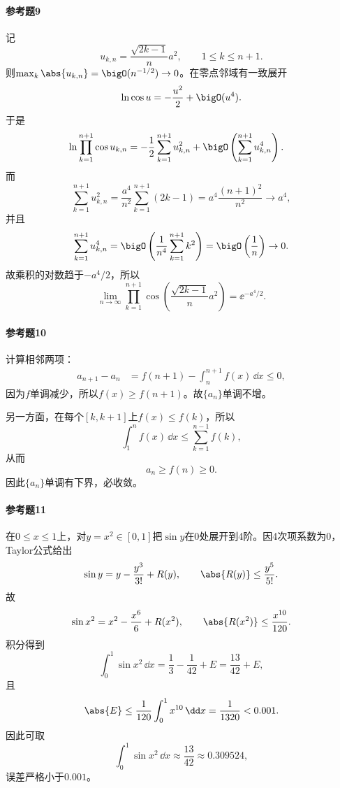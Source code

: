 \paragraph{参考题9}
\begin{xsolution}
记
\[
 u_{k,n}=\frac{\sqrt{2k-1}}{n}a^2,
 \qquad 1\le k\le n+1.
\]
则$\max_k\abs{u_{k,n}}=\bigO(n^{-1/2})\to0$。在零点邻域有一致展开
\[
 \ln\cos u=-\frac{u^2}{2}+\bigO(u^4).
\]
于是
\begin{align*}
\ln\prod_{k=1}^{n+1}\cos u_{k,n}
&=-\frac12\sum_{k=1}^{n+1}u_{k,n}^2
 +\bigO\left(\sum_{k=1}^{n+1}u_{k,n}^4\right).
\end{align*}
而
\[
 \sum_{k=1}^{n+1}u_{k,n}^2
 =\frac{a^4}{n^2}\sum_{k=1}^{n+1}(2k-1)
 =a^4\frac{(n+1)^2}{n^2}\to a^4,
\]
并且
\[
 \sum_{k=1}^{n+1}u_{k,n}^4
 =\bigO\left(\frac1{n^4}\sum_{k=1}^{n+1}k^2\right)
 =\bigO\left(\frac1n\right)\to0.
\]
故乘积的对数趋于$-a^4/2$，所以
\[
 \boxed{\lim_{n\to\infty}\prod_{k=1}^{n+1}
 \cos\left(\frac{\sqrt{2k-1}}n a^2\right)=\ee^{-a^4/2}}.
\]
\end{xsolution}

\paragraph{参考题10}
\begin{xsolution}
计算相邻两项：
\begin{align*}
a_{n+1}-a_n
&=f(n+1)-\int_n^{n+1}f(x)\,\dd x\le0,
\end{align*}
因为$f$单调减少，所以$f(x)\ge f(n+1)$。故$\{a_n\}$单调不增。

另一方面，在每个$[k,k+1]$上$f(x)\le f(k)$，所以
\[
 \int_1^nf(x)\,\dd x\le\sum_{k=1}^{n-1}f(k),
\]
从而
\[
 a_n\ge f(n)\ge0.
\]
因此$\{a_n\}$单调有下界，必收敛。
\end{xsolution}

\paragraph{参考题11}
\begin{xsolution}
在$0\le x\le1$上，对$y=x^2\in[0,1]$把$\sin y$在0处展开到4阶。因4次项系数为0，Taylor公式给出
\[
 \sin y=y-\frac{y^3}{3!}+R(y),
 \qquad \abs{R(y)}\le\frac{y^5}{5!}.
\]
故
\[
 \sin x^2=x^2-\frac{x^6}{6}+R(x^2),
 \qquad \abs{R(x^2)}\le\frac{x^{10}}{120}.
\]
积分得到
\[
 \int_0^1\sin x^2\,\dd x
 =\frac13-\frac1{42}+E
 =\frac{13}{42}+E,
\]
且
\[
 \abs{E}\le\frac1{120}\int_0^1x^{10}\,\dd x
 =\frac1{1320}<0.001.
\]
因此可取
\[
 \boxed{\int_0^1\sin x^2\,\dd x\approx\frac{13}{42}\approx0.309524},
\]
误差严格小于$0.001$。
\end{xsolution}

